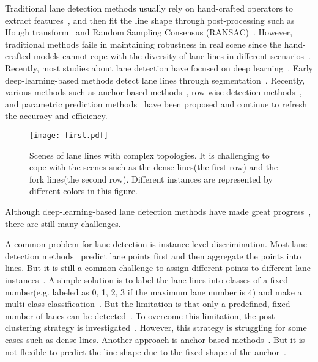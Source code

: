 \documentclass[10pt,twocolumn,letterpaper]{article}
\begin{document}
Traditional lane detection methods usually rely on hand-crafted operators to extract features~\cite{liu2010combining, zhou2010novel, hur2013multi, kim2008robust, jiang2009new, borkar2009robust, jiang2010computer, tan2014novel}, and then fit the line shape through post-processing such as Hough transform~\cite{liu2010combining, zhou2010novel} and Random Sampling Consensus (RANSAC)~\cite{kim2008robust, jiang2009new}.
However, traditional methods faile in maintaining robustness in real scene since the hand-crafted models cannot cope with the diversity of lane lines in different scenarios~\cite{neven2018towards}.
Recently, most studies about lane detection have focused on deep learning~\cite{tang2020review}. Early deep-learning-based methods detect lane lines through segmentation~\cite{pan2018spatial, neven2018towards}. Recently, various methods such as anchor-based methods~\cite{tabelini2020keep, chen2019pointlanenet, li2020curvelane}, row-wise detection methods~\cite{qin2020ultra, philion2019fastdraw, yoo2020end}, and parametric prediction methods~\cite{tabelini2020polylanenet, liu2021end} have been proposed and continue to refresh the accuracy and efficiency.

\begin{figure}[t!]
\centering
\texttt{[image: first.pdf]}
\caption{Scenes of lane lines with complex topologies. It is challenging to cope with the scenes such as the dense lines(the first row) and the fork lines(the second row). Different instances are represented by different colors in this figure.} \label{Fig.first} \end{figure}
Although deep-learning-based lane detection methods have made great progress~\cite{yurtsever2020survey}, there are still many challenges.

A common problem for lane detection is instance-level discrimination. Most lane detection methods~\cite{neven2018towards, pan2018spatial, ko2020key, tabelini2020keep, hou2019learning, lee2017vpgnet, philion2019fastdraw, chen2019pointlanenet, qin2020ultra, yoo2020end, li2020curvelane} predict lane points first and then aggregate the points into lines. But it is still a common challenge to assign different points to different lane instances~\cite{tang2020review}. A simple solution is to label the lane lines into classes of a fixed number(e.g. labeled as 0, 1, 2, 3 if the maximum lane number is 4) and make a multi-class classification~\cite{pan2018spatial, qin2020ultra, yoo2020end, chougule2018reliable}. But the limitation is that only a predefined, fixed number of lanes can be detected~\cite{neven2018towards}. To overcome this limitation, the post-clustering strategy is investigated~\cite{neven2018towards, ko2020key}. However, this strategy is struggling for some cases such as dense lines. Another approach is anchor-based methods~\cite{liu2021end, li2019line, li2020curvelane}. But it is not flexible to predict the line shape due to the fixed shape of the anchor~\cite{li2020curvelane}.
\end{document}
